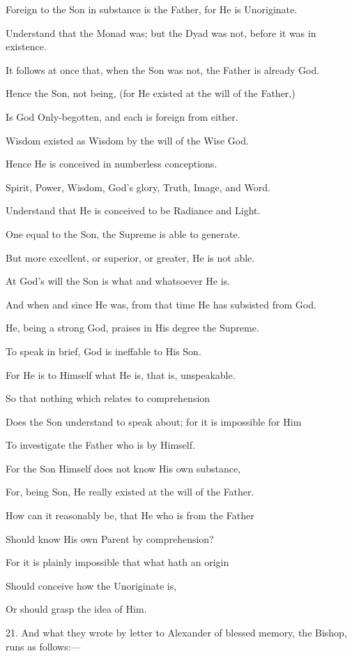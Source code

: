 Foreign to the Son in
substance is the Father, for He is Unoriginate.

Understand that the Monad was;
but the Dyad was not, before it was in existence.

It follows at once that, when
the Son was not, the Father is already God.

Hence the Son, not being, (for
He existed at the will of the Father,)

Is God Only-begotten, and each
is foreign from either.

Wisdom existed as Wisdom by
the will of the Wise God.

Hence He is conceived in
numberless conceptions.

Spirit, Power, Wisdom, God's
glory, Truth, Image, and Word.

Understand that He is
conceived to be Radiance and Light.

One equal to the Son, the
Supreme is able to generate.

But more excellent, or
superior, or greater, He is not able.

At God's will the Son is what
and whatsoever He is.

And when and since He was,
from that time He has subsisted from God.

He, being a strong God,
praises in His degree the Supreme.

To speak in brief, God is
ineffable to His Son.

For He is to Himself what He
is, that is, unspeakable.

So that nothing which relates
to comprehension 

Does the Son understand to
speak about; for it is impossible for Him

To investigate the Father who
is by Himself.

For the Son Himself does not
know His own substance,

For, being Son, He really
existed at the will of the Father.

How can it reasonably be, that
He who is from the Father

Should know His own Parent by
comprehension?

For it is plainly impossible
that what hath an origin

Should conceive how the
Unoriginate is,

Or should grasp the idea of
Him.

21. And what they wrote by
letter to Alexander of blessed memory, the Bishop, runs as follows:—

